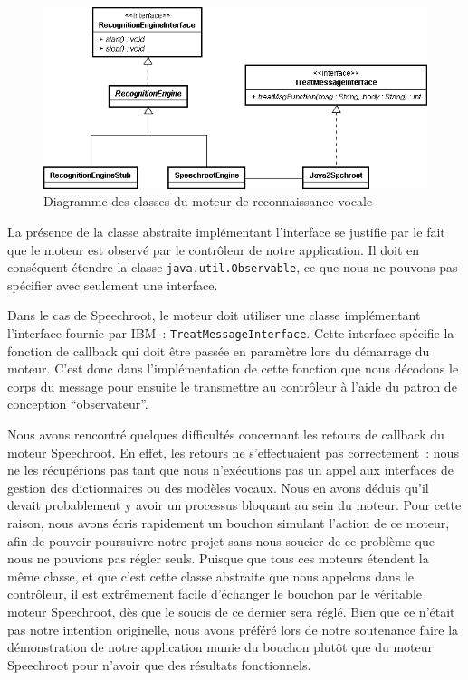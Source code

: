 \begin{figure}[ht!]
 \centering
 \includegraphics[scale=.5,keepaspectratio=true]{./images/EngineDiagram.png}
 \caption{Diagramme des classes du moteur de reconnaissance vocale}
 \label{fig:engineDiagram}
\end{figure}

La présence de la classe abstraite implémentant l'interface se justifie par le fait que le moteur est observé par le contrôleur de notre application.
Il doit en conséquent étendre la classe \texttt{java.util.Observable}, ce que nous ne pouvons pas spécifier avec seulement une interface.

Dans le cas de Speechroot, le moteur doit utiliser une classe implémentant l'interface fournie par IBM~: \texttt{TreatMessageInterface}.
Cette interface spécifie la fonction de callback qui doit être passée en paramètre lors du démarrage du moteur.
C'est donc dans l'implémentation de cette fonction que nous décodons le corps du message pour ensuite le transmettre au contrôleur à l'aide du patron de conception ``observateur''.

Nous avons rencontré quelques difficultés concernant les retours de callback du moteur Speechroot.
En effet, les retours ne s'effectuaient pas correctement~: nous ne les récupérions pas tant que nous n'exécutions pas un appel aux interfaces de gestion des dictionnaires ou des modèles vocaux.
Nous en avons déduis qu'il devait probablement y avoir un processus bloquant au sein du moteur.
Pour cette raison, nous avons écris rapidement un bouchon simulant l'action de ce moteur, afin de pouvoir poursuivre notre projet sans nous soucier de ce problème que nous ne pouvions pas régler seuls.
Puisque que tous ces moteurs étendent la même classe, et que c'est cette classe abstraite que nous appelons dans le contrôleur, il est extrêmement facile d'échanger le bouchon par le véritable moteur Speechroot, dès que le soucis de ce dernier sera réglé.
Bien que ce n'était pas notre intention originelle, nous avons préféré lors de notre soutenance faire la démonstration de notre application munie du bouchon plutôt que du moteur Speechroot pour n'avoir que des résultats fonctionnels.



